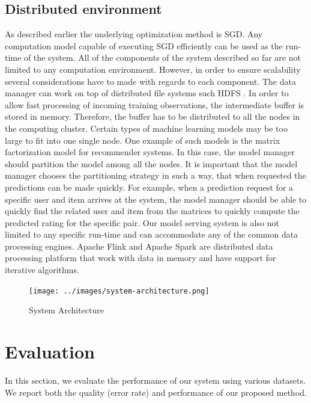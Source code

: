 \documentclass{sig-alternate-05-2015}
\begin{document}
\subsection{Distributed environment} 
As described earlier the underlying optimization method is SGD.
Any computation model capable of executing SGD efficiently can be used as the run-time of the system.
All of the components of the system described so far are not limited to any computation environment.
However, in order to ensure scalability several considerations have to made with regards to each component.
The data manager can work on top of distributed file systems such HDFS \cite{shvachko2010hadoop}. 
In order to allow fast processing of incoming training observations, the intermediate buffer is stored in memory.
Therefore, the buffer has to be distributed to all the nodes in the computing cluster.
Certain types of machine learning models may be too large to fit into one single node.
One example of such models is the matrix factorization model for recommender systems.
In this case, the model manager should partition the model among all the nodes.
It is important that the model manager chooses the partitioning strategy in such a way, that when requested the predictions can be made quickly.
For example, when a prediction request for a specific user and item arrives at the system, the model manager should be able to quickly find the related user and item from the matrices to quickly compute the predicted rating for the specific pair.
Our model serving system is also not limited to any specific run-time and can accommodate any of the common data processing engines.
Apache Flink \cite{carbone2015apache} and Apache Spark \cite{zaharia2010spark} are distributed data processing platform that work with data in memory and have support for iterative algorithms. %

\begin{figure}[t]
\centering
\texttt{[image: ../images/system-architecture.png]}
\caption{System Architecture}
\label{fig:system-architecture}
\end{figure}

\section{Evaluation} \label{evaluation} 
In this section, we evaluate the performance of our system using various datasets. 
We report both the quality (error rate) and performance of our proposed method. 
\end{document}
